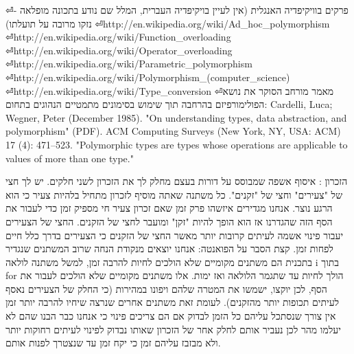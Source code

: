         \begin{ציינון}
⏎פרקים בוויקיפדיה האנגלית (אין לעיין בויקיפדיה העברית, המלל שם נודע בתכונה מופלאה - נזקו מרובה על תועלתו)
⏎http://en.wikipedia.org/wiki/Ad\_hoc\_polymorphism
⏎http://en.wikipedia.org/wiki/Function\_overloading
⏎http://en.wikipedia.org/wiki/Operator\_overloading
⏎http://en.wikipedia.org/wiki/Parametric\_polymorphism
⏎http://en.wikipedia.org/wiki/Polymorphism\_(computer\_science)
⏎http://en.wikipedia.org/wiki/Type\_conversion
⏎מאמר מורחב הסוקר את נושא הפולימורפיזם בהרחבה תוך שימוש בסימונים מתמטיים הנהוגים בתחום:
        Cardelli, Luca; Wegner, Peter (December 1985). "On understanding types, data abstraction, and polymorphism" (PDF). ACM Computing Surveys (New York, NY, USA: ACM) 17 (4): 471–523. "Polymorphic types are types whose operations are applicable to values of more than one type."
    \end{ציינון}

        הזכרון
        :
        איסוף אשפה שמבוסס על דורות בעצם מחלק לך את הזכרון לשני חלקים. יש לך חצי של
        "צעירים" וחצי של "זקנים". כל משתנה שאתה מוסיף לזכרון מתחיל בלהיות צעיר כי הוא
        הרגע נוצר. אנחנו מגדירים איזשהו פרק זמן שאם זכרון צעיר חי מספיק זמן כדי לעבור
        את הסף הזה שהגדרנו אז הוא הופך להיות "זקן" ומועבר לחצי של הזקנים. החצי של
        הצעירים יעבור פינוי אשמה לעיתים קרובות יותר מאשר החצי של הזקנים כי הצעירים בדרך
        כלל חיים לפחות זמן. קצת הסבר על הפואנטה: אנחנו יוצאים מנקודת הנחה שרוב המשתנים
        שנגדיר בתכנית הם משתנים מקומיים שלא הולכים לחיות להרבה זמן, למשל משתנה לולאה i
        בתוך for הולך לחיות עד שתגמר הלולאה ואז ימות. אלו משתנים מקומיים שלא הולכים
        לעבור את הסף, לכן יוקצו, ישמשו את המטרה שלהם ויפונו במהירות (כי החלק של הצעירים
        נאסף לעיתים תכופות יותר מהזקנים). לעומת זאת משתנים אחרים שנרצה שיחיו להרבה
        יותר זמן אין צורך שנסתכל עליהם כל הזמן לבדוק אם הם צריכים פינוי כי אנחנו כבר
        הבנו שהם לא יעלמו מהר לכן נעביר אותם לחלק אחר של הזכרון שאותו נבדוק לפינוי
        לעיתים רחוקות יותר ולא מבזבז עליהם זמן כי יקח זמן עד שנצטרך לפנות אותם.

